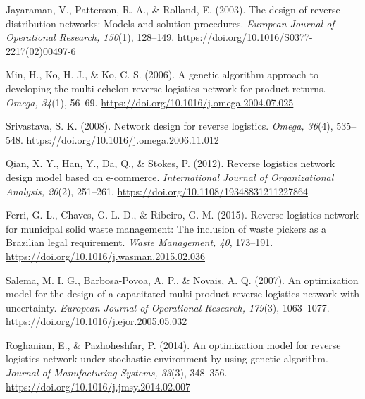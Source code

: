 \newpage %
\begin{thebibliography}{99} %

Jayaraman, V., Patterson, R. A., \& Rolland, E. (2003). The design of reverse distribution networks: Models and solution procedures. \textit{European Journal of Operational Research, 150}(1), 128--149. \href{https://doi.org/10.1016/S0377-2217(02)00497-6}{https://doi.org/10.1016/S0377-2217(02)00497-6}

Min, H., Ko, H. J., \& Ko, C. S. (2006). A genetic algorithm approach to developing the multi-echelon reverse logistics network for product returns. \textit{Omega, 34}(1), 56--69. \href{https://doi.org/10.1016/j.omega.2004.07.025}{https://doi.org/10.1016/j.omega.2004.07.025}

Srivastava, S. K. (2008). Network design for reverse logistics. \textit{Omega, 36}(4), 535--548. \href{https://doi.org/10.1016/j.omega.2006.11.012}{https://doi.org/10.1016/j.omega.2006.11.012}

Qian, X. Y., Han, Y., Da, Q., \& Stokes, P. (2012). Reverse logistics network design model based on e-commerce. \textit{International Journal of Organizational Analysis, 20}(2), 251--261. \href{https://doi.org/10.1108/19348831211227864}{https://doi.org/10.1108/19348831211227864}

Ferri, G. L., Chaves, G. L. D., \& Ribeiro, G. M. (2015). Reverse logistics network for municipal solid waste management: The inclusion of waste pickers as a Brazilian legal requirement. \textit{Waste Management, 40}, 173--191. \href{https://doi.org/10.1016/j.wasman.2015.02.036}{https://doi.org/10.1016/j.wasman.2015.02.036}

Salema, M. I. G., Barbosa-Povoa, A. P., \& Novais, A. Q. (2007). An optimization model for the design of a capacitated multi-product reverse logistics network with uncertainty. \textit{European Journal of Operational Research, 179}(3), 1063--1077. \href{https://doi.org/10.1016/j.ejor.2005.05.032}{https://doi.org/10.1016/j.ejor.2005.05.032}

Roghanian, E., \& Pazhoheshfar, P. (2014). An optimization model for reverse logistics network under stochastic environment by using genetic algorithm. \textit{Journal of Manufacturing Systems, 33}(3), 348--356. \href{https://doi.org/10.1016/j.jmsy.2014.02.007}{https://doi.org/10.1016/j.jmsy.2014.02.007}


\end{thebibliography}
